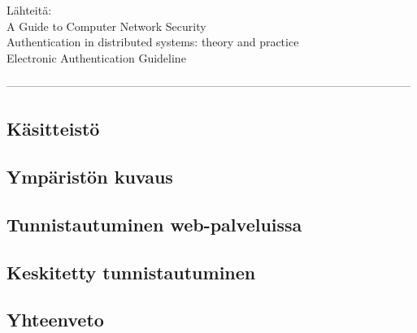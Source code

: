 Lähteitä:\\
A Guide to Computer Network Security \cite{authentication}\\
Authentication in distributed systems: theory and practice \cite{lampson}\\
Electronic Authentication Guideline \cite{nisti}

-----------------------------------------------------------------------------------------------------------


\subsection{Käsitteistö}

\subsection{Ympäristön kuvaus}

\subsection{Tunnistautuminen web-palveluissa}

\subsection{Keskitetty tunnistautuminen}

\subsection{Yhteenveto}

